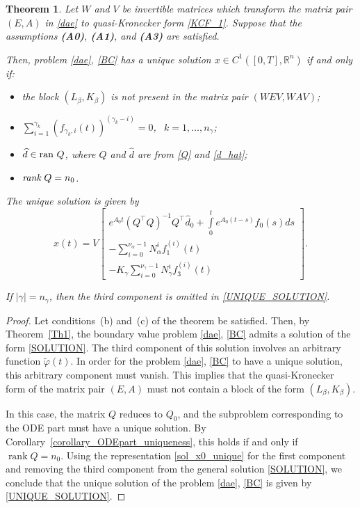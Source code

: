 \documentclass[preprint,12pt]{elsarticle}
\numberwithin{equation}{section}
\newtheorem{theorem}{Theorem}[section]
\theoremstyle{definition}
\begin{document}
\begin{theorem}\label{Theorem_GenBVP_UniqueSolution}
    Let $W$ and $V$ be invertible matrices which transform the matrix pair $(E,A)$ in \eqref{dae} to quasi-Kronecker form \eqref{KCF_1}. Suppose that the assumptions
    \textnormal{\textbf{(A0)}}, \textnormal{\textbf{(A1)}}, and \textnormal{\textbf{(A3)}}
    are satisfied.

        Then, problem \eqref{dae}, \eqref{BC} has a unique solution $x\in C^1([0,T],\mathbb{R}^n)$ if and only if:
         \begin{itemize}
        \item[\emph{(a)}] the block $(L_{\beta},K_{\beta})$ is not present in the matrix pair $(WEV, WAV)$;
        \item[\emph{(b)}] $\sum\limits_{i=1}^{\gamma_k}\left(f_{\gamma_k,i}(t)\right)^{(\gamma_k-i)}=0$, $~~k=1,\ldots,n_{\gamma}$;
         \item[\emph{(c)}] $\widehat{d}\in \textnormal{ran}~ Q$, where $Q$ and $\widehat{d}$ are from \eqref{Q} and \eqref{d_hat};
         \item[\emph{(d)}] $\emph{rank}~ Q=n_0$.
        \end{itemize}

        The unique solution is given by
        \begin{equation}\label{UNIQUE_SOLUTION}
            x(t)=V\begin{bmatrix}
        e^{A_0t}(Q^\top Q)^{-1}Q^\top\widehat{d}_0+\int\limits_0^t e^{A_0(t-s)}f_0(s)ds\\
        -\sum\limits_{i=0}^{\nu_{\alpha}-1}N_{\alpha}^i f_1^{(i)}(t)\\
        -K_{\gamma}\sum\limits_{i=0}^{\nu_{\gamma}-1}N_{\gamma}^i f_3^{(i)}(t)
         \end{bmatrix}.
        \end{equation}

If \( |\gamma| = n_{\gamma} \), then the third component is omitted in \eqref{UNIQUE_SOLUTION}.
\end{theorem}
\begin{proof}
Let conditions~(b) and~(c) of the theorem be satisfied. Then, by Theorem~\ref{Th1}, the boundary value problem \eqref{dae}, \eqref{BC} admits a solution of the form \eqref{SOLUTION}. The third component of this solution involves an arbitrary function $\widetilde{\varphi}(t)$. In order for the problem \eqref{dae}, \eqref{BC} to have a unique solution, this arbitrary component must vanish. This implies that the quasi-Kronecker form of the matrix pair $(E, A)$ must not contain a block of the form $(L_{\beta}, K_{\beta})$.

In this case, the matrix $Q$ reduces to $Q_0$, and the subproblem corresponding to the ODE part must have a unique solution. By Corollary~\ref{corollary_ODEpart_uniqueness}, this holds if and only if $\operatorname{rank} Q = n_0$. Using the representation \eqref{sol_x0_unique} for the first component and removing the third component from the general solution \eqref{SOLUTION}, we conclude that the unique solution of the problem \eqref{dae}, \eqref{BC} is given by \eqref{UNIQUE_SOLUTION}.

\end{proof}
\end{document}
